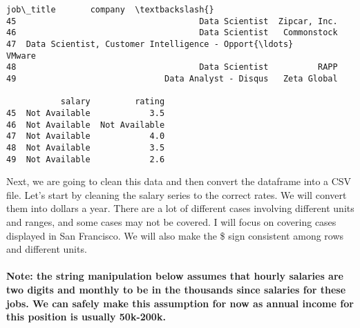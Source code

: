 \documentclass[11pt]{article}
\makeatletter
\newcommand{\boxspacing}{\kern\kvtcb@left@rule\kern\kvtcb@boxsep}
\newcommand{\prompt}[4]{
        \ttfamily\llap{{\color{#2}[#3]:\hspace{3pt}#4}}\vspace{-\baselineskip}
    }
\makeatother
\begin{document}
            \begin{tcolorbox}[breakable, size=fbox, boxrule=.5pt, pad at break*=1mm, opacityfill=0]
\prompt{Out}{outcolor}{20}{\boxspacing}
\begin{Verbatim}[commandchars=\\\{\}]
                                            job\_title       company  \textbackslash{}
45                                     Data Scientist  Zipcar, Inc.
46                                     Data Scientist   Commonstock
47  Data Scientist, Customer Intelligence - Opport{\ldots}        VMware
48                                     Data Scientist          RAPP
49                              Data Analyst - Disqus   Zeta Global

           salary         rating
45  Not Available            3.5
46  Not Available  Not Available
47  Not Available            4.0
48  Not Available            3.5
49  Not Available            2.6
\end{Verbatim}
\end{tcolorbox}
        
    Next, we are going to clean this data and then convert the dataframe
into a CSV file. Let's start by cleaning the salary series to the
correct rates. We will convert them into dollars a year. There are a lot
of different cases involving different units and ranges, and some cases
may not be covered. I will focus on covering cases displayed in San
Francisco. We will also make the \$ sign consistent among rows and
different units.

\hypertarget{note-the-string-manipulation-below-assumes-that-hourly-salaries-are-two-digits-and-monthly-to-be-in-the-thousands-since-salaries-for-these-jobs.-we-can-safely-make-this-assumption-for-now-as-annual-income-for-this-position-is-usually-50k-200k.}{%
\paragraph{Note: the string manipulation below assumes that hourly
salaries are two digits and monthly to be in the thousands since
salaries for these jobs. We can safely make this assumption for now as
annual income for this position is usually
50k-200k.}\label{note-the-string-manipulation-below-assumes-that-hourly-salaries-are-two-digits-and-monthly-to-be-in-the-thousands-since-salaries-for-these-jobs.-we-can-safely-make-this-assumption-for-now-as-annual-income-for-this-position-is-usually-50k-200k.}}
\end{document}
